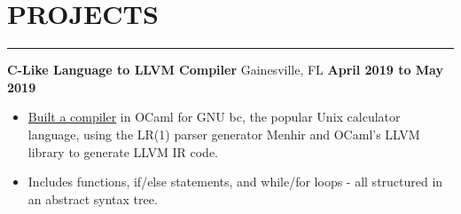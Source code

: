 \section*{PROJECTS}

\hrule \relax
\sectionheaderspace

\noindent\textbf{C-Like Language to LLVM Compiler} Gainesville, FL  \hfill\textbf{April 2019 to May 2019}
\begin{itemize}[noitemsep,nolistsep, label={-}]
	\item \href{https://github.com/hodsonus/programming-language-concepts}{Built a compiler} in OCaml for GNU bc, the popular Unix calculator language, using the LR(1) parser generator Menhir and OCaml's LLVM library to generate LLVM IR code.
	\item Includes functions, if/else statements, and while/for loops - all structured in an abstract syntax tree.
\end{itemize}
\subsectionspace